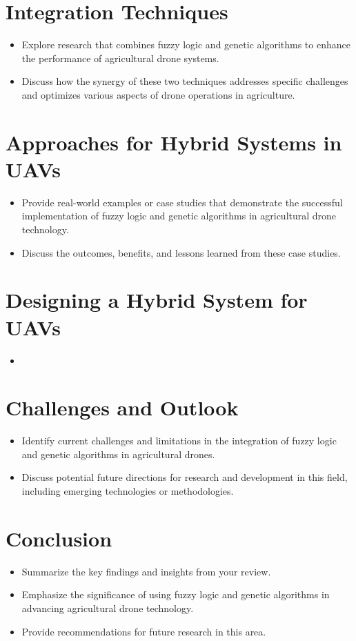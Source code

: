 \documentclass{IEEEtran}
\begin{document}
\section{Integration Techniques}
    \begin{itemize}
        \item     Explore research that combines fuzzy logic and genetic algorithms to enhance the performance of agricultural drone systems.
        \item Discuss how the synergy of these two techniques addresses specific challenges and optimizes various aspects of drone operations in agriculture.
    \end{itemize}
\section{Approaches for Hybrid Systems in UAVs}
    \begin{itemize}
        \item Provide real-world examples or case studies that demonstrate the successful implementation of fuzzy logic and genetic algorithms in agricultural drone technology.
        \item Discuss the outcomes, benefits, and lessons learned from these case studies.
    \end{itemize}

\section{Designing a Hybrid System for UAVs}
    \begin{itemize}
        \item 
    \end{itemize}

\section{Challenges and Outlook}
    \begin{itemize}
        \item Identify current challenges and limitations in the integration of fuzzy logic and genetic algorithms in agricultural drones.
        \item Discuss potential future directions for research and development in this field, including emerging technologies or methodologies. \cite{key4}
    \end{itemize}

\section{Conclusion}
    \begin{itemize}
        \item Summarize the key findings and insights from your review.
        \item Emphasize the significance of using fuzzy logic and genetic algorithms in advancing agricultural drone technology.
        \item Provide recommendations for future research in this area.
    \end{itemize}



\end{document}
